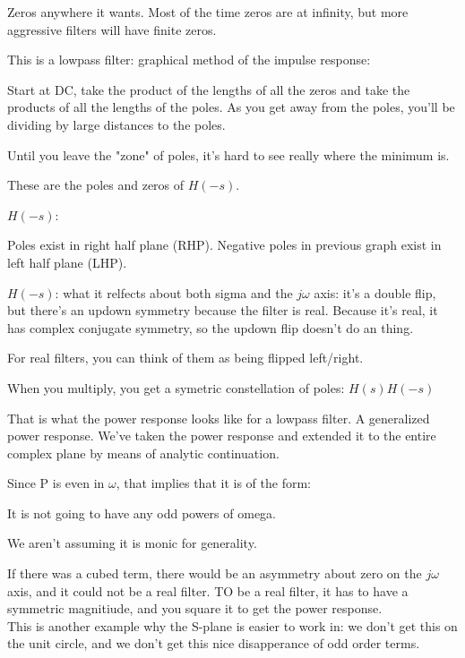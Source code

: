 Zeros anywhere it wants. 
Most of the time zeros are at infinity, but more aggressive filters will have
finite zeros.

This is a lowpass filter: graphical method of the impulse response:

Start at DC, take the product of the lengths of all the zeros and take the
products of all the lengths of the poles. As you get away from the poles,
you'll be dividing by large distances to the poles.

Until you leave the "zone" of poles, it's hard to see really where the minimum 
is. 

These are the poles and zeros of $H(-s)$. 

$H(-s)$:

Poles exist in right half plane (RHP). Negative poles in previous graph
exist in left half plane (LHP). 

$H(-s)$: what it relfects about both sigma and the $j\omega$ axis: it's a
double flip, but there's an updown symmetry because the filter is real. Because
it's real, it has complex conjugate symmetry, so the updown flip doesn't do an thing.


For real filters, you can think of them as being flipped left/right.

When you multiply, you get a symetric constellation of poles:
$H(s)H(-s)$

That is what the power response looks like for a lowpass filter. A generalized
power response. We've taken the power response and extended it to the entire 
complex plane by means of analytic continuation. 


Since P is even in $\omega$, that implies that it is of the form:


It is not going to have any odd powers of omega. 

We aren't assuming it is monic for generality. 

If there was a cubed term, there would be an asymmetry about zero on the
$j\omega$ axis, and it could not be a real filter. TO be a real filter,
it has to have a symmetric magnitiude, and you square it to get the power
response. \\

This is another example why the S-plane is easier to work in: we don't
get this on the unit circle, and we don't get this nice disapperance of
odd order terms. 

